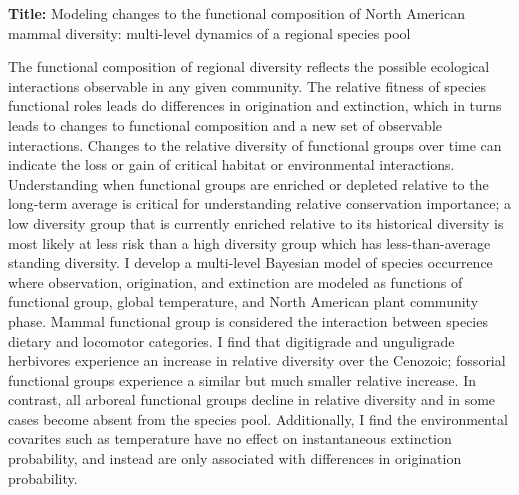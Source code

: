 \documentclass[12pt,letterpaper]{article}
\begin{document}
\textbf{Title:} Modeling changes to the functional composition of North American mammal diversity: multi-level dynamics of a regional species pool 

The functional composition of regional diversity reflects the possible ecological interactions observable in any given community. The relative fitness of species functional roles leads do differences in origination and extinction, which in turns leads to changes to functional composition and a new set of observable interactions. Changes to the relative diversity of functional groups over time can indicate the loss or gain of critical habitat or environmental interactions. Understanding when functional groups are enriched or depleted relative to the long-term average is critical for understanding relative conservation importance; a low diversity group that is currently enriched relative to its historical diversity is most likely at less risk than a high diversity group which has less-than-average standing diversity. I develop a multi-level Bayesian model of species occurrence where observation, origination, and extinction are modeled as functions of functional group, global temperature, and North American plant community phase. Mammal functional group is considered the interaction between species dietary and locomotor categories. I find that digitigrade and unguligrade herbivores experience an increase in relative diversity over the Cenozoic; fossorial functional groups experience a similar but much smaller relative increase. In contrast, all arboreal functional groups decline in relative diversity and in some cases become absent from the species pool. Additionally, I find the environmental covarites such as temperature have no effect on instantaneous extinction probability, and instead are only associated with differences in origination probability.
\end{document}
